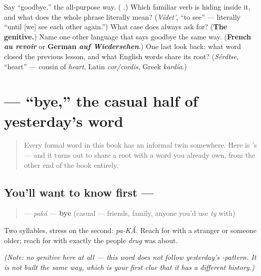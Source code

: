 \begin{tcolorbox}[breakable,colback=teal!4,colframe=teal!35!black,title={Before you move on}]
Say \textquotedblleft{}goodbye,\textquotedblright{} the all-purpose way. (\textbf{ }.) Which familiar verb is hiding inside it, and what does the whole phrase literally mean? (\emph{Vídet'}, \textquotedblleft{}to see\textquotedblright{} — literally \textquotedblleft{}until {[}we{]} see each other again.\textquotedblright{}) What case does \textbf{} always ask for? (\textbf{The genitive.}) Name one other language that says goodbye the same way. (\textbf{French \emph{au revoir}} or \textbf{German \emph{auf Wiedersehen}}.) One last look back: what word closed the previous lesson, and what English words share its root? (\emph{Sérdtse}, \textquotedblleft{}heart\textquotedblright{} — cousin of \emph{heart}, Latin \emph{cor/cordis}, Greek \emph{kardía}.)
\end{tcolorbox}
\section[\texorpdfstring{\ru{пока} (paká)}{пока (paká)}]{ — \textquotedblleft{}bye,\textquotedblright{} the casual half of yesterday's word}

\label{lesson:RU-C11-poka}



\begin{quote}
Every formal word in this book has an informal twin somewhere. Here is \emph{ }'s — and it turns out to share a root with a word you already own, from the other end of the book entirely.
\end{quote}

\subsection*{You'll want to know first — }
\begin{quote}
\textbf{} — \emph{paká} — \textbf{bye} (casual — friends, family, anyone you'd use \emph{ty} with)
\end{quote}

Two syllables, stress on the second: \emph{pa-KÁ}. Reach for \emph{ } with a stranger or someone older; reach for \emph{} with exactly the people \emph{drug} was about.

\emph{(Note: no genitive here at all — this word does not follow yesterday's -pattern. It is not built the same way, which is your first clue that it has a different history.)}

